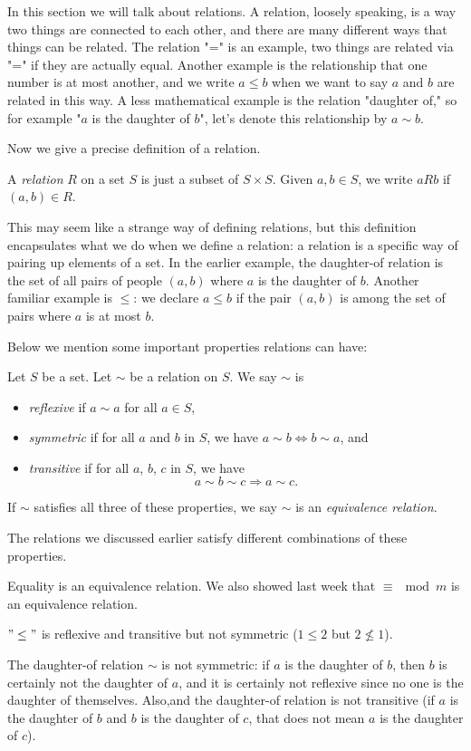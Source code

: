 \documentclass[11pt,dvipsnames]{book}
\numberwithin{figure}{section} %
\numberwithin{table}{section} %
\begin{document}
In this section we will talk about relations. A relation, loosely speaking, is a way two things are connected to each other, and there are many different ways that things can be related. The relation "=" is an example, two things are related via "=" if they are actually equal. Another example is the relationship that one number is at most another, and we write $a\leq b$ when we want to say $a$ and $b$ are related in this way. A less mathematical example is the relation "daughter of," so for example "$a$ is the daughter of $b$", let's denote this relationship by $a\sim b$.

Now we give a precise definition of a relation.

\begin{definition}
A {\it relation} $R$ on a set $S$ is just a subset of $S\times S$. Given $a,b\in S$, we write $aRb$ if $(a,b)\in R$.
\end{definition}

This may seem like a strange way of defining relations, but this definition encapsulates what we do when we define a relation: a relation is a specific way of pairing up elements of a set. In the earlier example, the daughter-of relation is the set of all pairs of people $(a,b)$ where $a$ is the daughter of $b$. Another familiar example is $\leq$: we declare $a\leq b$ if the pair $(a,b)$ is among the set of pairs where $a$ is at most $b$.

Below we mention some important properties relations can have:

 \begin{definition}
 Let $S$ be a set. Let $\sim$ be a relation on $S$. We say $\sim$ is
\begin{itemize}
\item {\it reflexive} if $a\sim a$ for all $a\in S$,
 \item {\it symmetric} if for all $a$ and $b$ in $S$,  we have $
a\sim b  \Longleftrightarrow  b\sim a$, and
 \item {\it transitive} if for all $a$, $b$, $c$ in $S$,  we have
\[
a\sim b\sim c\Longrightarrow  a\sim c.\]
\end{itemize}
If $\sim$ satisfies all three of these properties, we say $\sim$ is an {\it equivalence relation}.
\end{definition}

The relations we discussed earlier satisfy different combinations of these properties.

\begin{example}
\item Equality is an equivalence relation. We also showed last week that $\equiv \mod m$ is an equivalence relation.
\item $"\leq"$ is reflexive and transitive but not symmetric ($1\leq 2$ but $2\not\leq 1$).
\item The daughter-of relation $\sim$ is not symmetric: if $a$ is the daughter of $b$, then $b$ is certainly not the daughter of $a$, and it is certainly not reflexive since no one is the daughter of themselves. Also,and the daughter-of relation is not transitive (if $a$ is the daughter of $b$ and $b$ is the daughter of $c$, that does not mean $a$ is the daughter of $c$).
\end{example}
\end{document}
